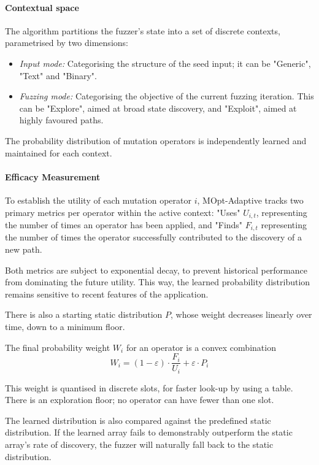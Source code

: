 \paragraph{Contextual space} The algorithm partitions the fuzzer's state into a set of discrete contexts, parametrised by two dimensions: 
\begin{itemize}
    \item \textit{Input mode:} Categorising the structure of the seed input; it can be "Generic", "Text" and "Binary".

    \item \textit{Fuzzing mode:} Categorising the objective of the current fuzzing iteration. This can be "Explore", aimed at broad state discovery, and "Exploit", aimed at highly favoured paths.
\end{itemize}
The probability distribution of mutation operators is independently learned and maintained for each context.

\paragraph{Efficacy Measurement} To establish the utility of each mutation operator $i$, MOpt-Adaptive tracks two primary metrics per operator within the active context: "Uses" $U_{i,t}$, representing the number of times an operator has been applied, and "Finds" $F_{i,t}$ representing the number of times the operator successfully contributed to the discovery of a new path.

Both metrics are subject to exponential decay, to prevent historical performance from dominating the future utility. This way, the learned probability distribution remains sensitive to recent features of the application.

There is also a starting static distribution $P$, whose weight decreases linearly over time, down to a minimum floor.

The final probability weight $W_i$ for an operator is a convex combination
\[
    W_i = (1 - \varepsilon) \cdot \frac{F_i}{U_i} + \varepsilon \cdot P_i
\]

This weight is quantised in discrete slots, for faster look-up by using a table. There is an exploration floor; no operator can have fewer than one slot.

The learned distribution is also compared against the predefined static distribution. If the learned array fails to demonstrably outperform the static array's rate of discovery, the fuzzer will naturally fall back to the static distribution.

